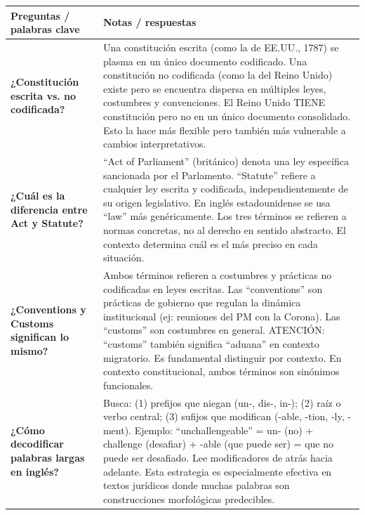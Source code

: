 \documentclass[12pt,oneside]{book}
\begin{document}
\begin{table}[H]
\centering
\begin{tabularx}{\textwidth}{
    >{\raggedright\arraybackslash}p{}
    >{\raggedright\arraybackslash}X
}
\toprule
\textbf{Preguntas / palabras clave} & \textbf{Notas / respuestas} \\
\midrule

\textbf{¿Constitución escrita vs. no codificada?} & 
Una constitución escrita (como la de EE.UU., 1787) se plasma en un único documento codificado. Una constitución no codificada (como la del Reino Unido) existe pero se encuentra dispersa en múltiples leyes, costumbres y convenciones. El Reino Unido TIENE constitución pero no en un único documento consolidado. Esto la hace más flexible pero también más vulnerable a cambios interpretativos. \\
\midrule

\textbf{¿Cuál es la diferencia entre Act y Statute?} & 
``Act of Parliament'' (británico) denota una ley específica sancionada por el Parlamento. ``Statute'' refiere a cualquier ley escrita y codificada, independientemente de su origen legislativo. En inglés estadounidense se usa ``law'' más genéricamente. Los tres términos se refieren a normas concretas, no al derecho en sentido abstracto. El contexto determina cuál es el más preciso en cada situación. \\
\midrule

\textbf{¿Conventions y Customs significan lo mismo?} & 
Ambos términos refieren a costumbres y prácticas no codificadas en leyes escritas. Las ``conventions'' son prácticas de gobierno que regulan la dinámica institucional (ej: reuniones del PM con la Corona). Las ``customs'' son costumbres en general. ATENCIÓN: ``customs'' también significa ``aduana'' en contexto migratorio. Es fundamental distinguir por contexto. En contexto constitucional, ambos términos son sinónimos funcionales. \\
\midrule

\textbf{¿Cómo decodificar palabras largas en inglés?} & 
Busca: (1) prefijos que niegan (un-, dis-, in-); (2) raíz o verbo central; (3) sufijos que modifican (-able, -tion, -ly, -ment). Ejemplo: ``unchallengeable'' = un- (no) + challenge (desafiar) + -able (que puede ser) = que no puede ser desafiado. Lee modificadores de atrás hacia adelante. Esta estrategia es especialmente efectiva en textos jurídicos donde muchas palabras son construcciones morfológicas predecibles. \\
\midrule


\end{tabularx}
\end{table}
\end{document}
